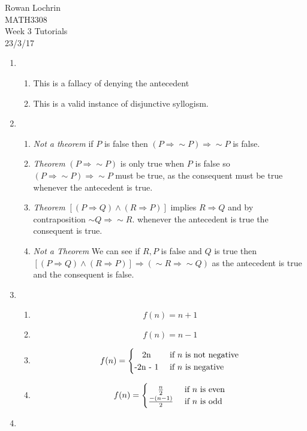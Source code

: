 \documentclass[11pt] {article}
\begin{document}
\begin{flushleft}
Rowan Lochrin\\
MATH3308\\
Week 3 Tutorials \\
23/3/17\\
\end{flushleft}

\begin{enumerate}
\item
\begin{enumerate}
\item This is a fallacy of denying the antecedent
\item This is a valid instance of disjunctive syllogism.
\end{enumerate}
\item
\begin{enumerate}
\item \textit{Not a theorem} if $P$ is false then $(P \Rightarrow \sim P) \Rightarrow \sim P$  is false.
\item \textit{Theorem} $(P \Rightarrow \sim P) $ is only true when $P$ is false so $(P \Rightarrow \sim P) \Rightarrow \sim P$ must be true, as the consequent must be true whenever the antecedent is true.
\item \textit{Theorem} $[(P\Rightarrow Q) \land (R \Rightarrow P)]$ implies $ R \Rightarrow Q $ and by contraposition $ \sim Q \Rightarrow \sim R$. whenever the antecedent is true the consequent is true.
\item \textit{Not a Theorem} We can see if $R,P$ is false and $Q$ is true then  $[(P\Rightarrow Q) \land (R \Rightarrow P)] \Rightarrow (\sim R \Rightarrow \sim Q)$ as the antecedent is true and the consequent is false.
\end{enumerate}
\item
\begin{enumerate}
\item
$$f(n) = n+1$$
\item
$$f(n) = n -1 $$
\item
\[
f(n) =  \begin{cases} 
      \hfill $2n$ \hfill & \text{ if $n$  is not negative} \\
      \hfill $-2n  - 1$ \hfill & \text{ if $n$ is negative} \\
  \end{cases}
  \]
  \item
\[
f(n) =  \begin{cases} 
      \hfill \frac{n}{2} \hfill & \text{ if $n$ is even} \\
      \hfill \frac{-(n - 1)}{2}  \hfill & \text{ if $n$ is odd} \\
  \end{cases}
  \]
\end{enumerate}
\item 


\end{enumerate}
\end{document}
